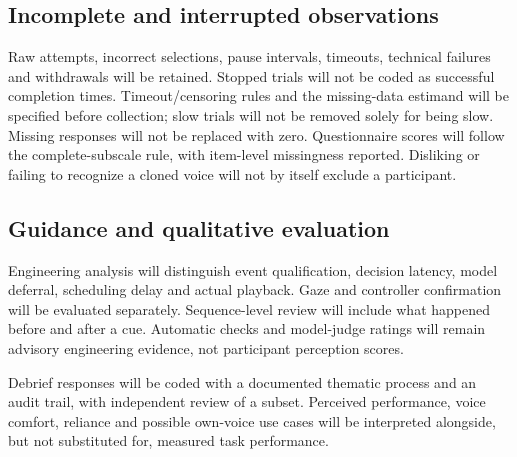 \documentclass[11pt,letterpaper]{article}
\begin{document}
\subsection{Incomplete and interrupted observations}
Raw attempts, incorrect selections, pause intervals, timeouts, technical failures and withdrawals will be retained. Stopped trials will not be coded as successful completion times. Timeout/censoring rules and the missing-data estimand will be specified before collection; slow trials will not be removed solely for being slow. Missing responses will not be replaced with zero. Questionnaire scores will follow the complete-subscale rule, with item-level missingness reported. Disliking or failing to recognize a cloned voice will not by itself exclude a participant.

\subsection{Guidance and qualitative evaluation}
Engineering analysis will distinguish event qualification, decision latency, model deferral, scheduling delay and actual playback. Gaze and controller confirmation will be evaluated separately. Sequence-level review will include what happened before and after a cue. Automatic checks and model-judge ratings will remain advisory engineering evidence, not participant perception scores.

Debrief responses will be coded with a documented thematic process and an audit trail, with independent review of a subset. Perceived performance, voice comfort, reliance and possible own-voice use cases will be interpreted alongside, but not substituted for, measured task performance.
\end{document}

